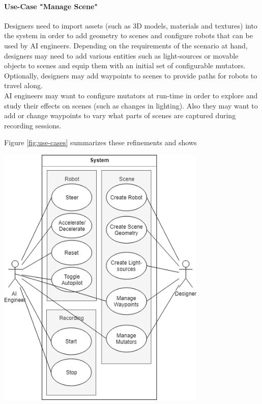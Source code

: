 \paragraph{Use-Case "Manage Scene"} Designers need to import assets (such as 3D models, materials and textures) into the system in order to add geometry to scenes and configure robots that can be used by \acs{AI} engineers. Depending on the requirements of the scenario at hand, designers may need to add various entities such as light-sources or movable objects to scenes and equip them with an initial set of configurable mutators. Optionally, designers may add waypoints to scenes to provide paths for robots to travel along.\\
\acs{AI} engineers may want to configure mutators at run-time in order to explore and study their effects on scenes (such as changes in lighting). Also they may want to add or change waypoints to vary what parts of scenes are captured during recording sessions.

Figure \ref{fig:use-cases} summarizes these refinements and shows
\begin{center}
\noindent\includegraphics[width=10cm]{tex/img/ch04/UseCases_Fine_01.png}
\label{fig:use-cases}
\end{center}

